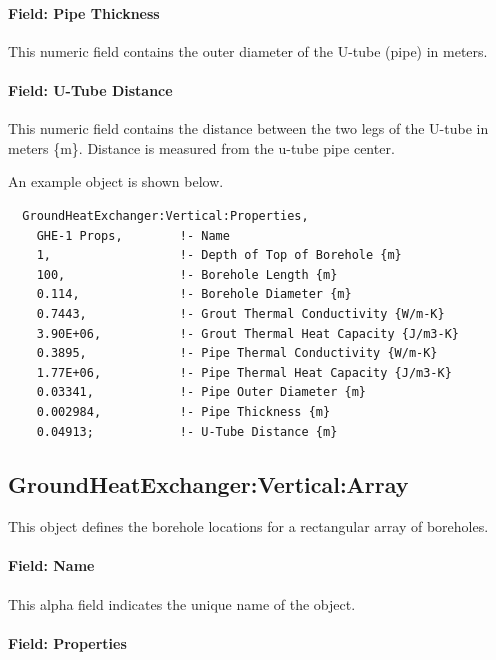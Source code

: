 \paragraph{Field: Pipe Thickness}\label{field-pipe-thickness-000}

This numeric field contains the outer diameter of the U-tube (pipe) in meters.

\paragraph{Field: U-Tube Distance}\label{field-u-tube-distance}

This numeric field contains the distance between the two legs of the U-tube in meters \{m\}. Distance is measured from the u-tube pipe center.

An example object is shown below.

\begin{lstlisting}
  GroundHeatExchanger:Vertical:Properties,
    GHE-1 Props,        !- Name
    1,                  !- Depth of Top of Borehole {m}
    100,                !- Borehole Length {m}
    0.114,              !- Borehole Diameter {m}
    0.7443,             !- Grout Thermal Conductivity {W/m-K}
    3.90E+06,           !- Grout Thermal Heat Capacity {J/m3-K}
    0.3895,             !- Pipe Thermal Conductivity {W/m-K}
    1.77E+06,           !- Pipe Thermal Heat Capacity {J/m3-K}
    0.03341,            !- Pipe Outer Diameter {m}
    0.002984,           !- Pipe Thickness {m}
    0.04913;            !- U-Tube Distance {m}
\end{lstlisting}

\subsection{GroundHeatExchanger:Vertical:Array}\label{groundheatexchangerverticalarray}

This object defines the borehole locations for a rectangular array of boreholes.

\paragraph{Field: Name}

This alpha field indicates the unique name of the object.

\paragraph{Field: Properties}

